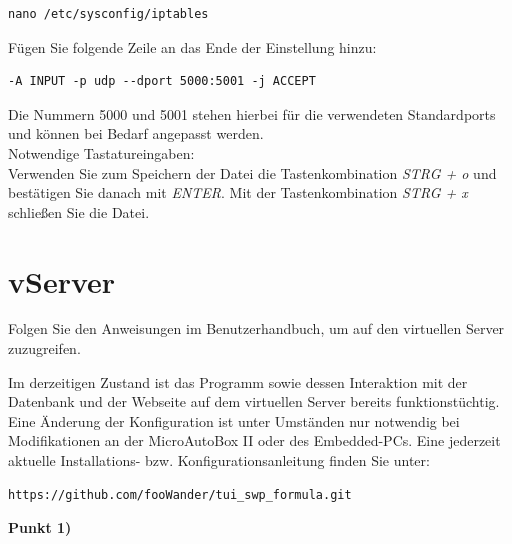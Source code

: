 \documentclass[fontsize = 12pt, paper = a4]{scrreprt}
\begin{document}
\vspace*{4mm}
\begin{lstlisting}[frame=single]
nano /etc/sysconfig/iptables
\end{lstlisting} 
\vspace*{-2mm}

Fügen Sie folgende Zeile an das Ende der Einstellung hinzu:

\vspace*{4mm}
\begin{lstlisting}[frame=single]
-A INPUT -p udp --dport 5000:5001 -j ACCEPT
\end{lstlisting} 
\vspace*{-2mm}

Die Nummern 5000 und 5001 stehen hierbei für die verwendeten Standardports und können bei Bedarf angepasst werden.\\

Notwendige Tastatureingaben: \\

Verwenden Sie zum Speichern der Datei die Tastenkombination \textit{STRG + o} und bestätigen Sie danach mit \textit{ENTER}. Mit der Tastenkombination \textit{STRG + x} schließen Sie die Datei. 




\section{vServer}


Folgen Sie den Anweisungen im Benutzerhandbuch, um auf den virtuellen Server zuzugreifen.

Im derzeitigen Zustand ist das Programm sowie dessen Interaktion mit der Datenbank und der Webseite auf dem virtuellen Server bereits funktionstüchtig. Eine Änderung der Konfiguration ist unter Umständen nur notwendig bei Modifikationen an der MicroAutoBox II oder des Embedded-PCs. Eine jederzeit aktuelle Installations- bzw. Konfigurationsanleitung finden Sie unter:

\vspace*{4mm}
\begin{lstlisting}[frame=single]
https://github.com/fooWander/tui_swp_formula.git
\end{lstlisting} 
\vspace*{-2mm}

\textbf{Punkt 1)} \\
\end{document}
